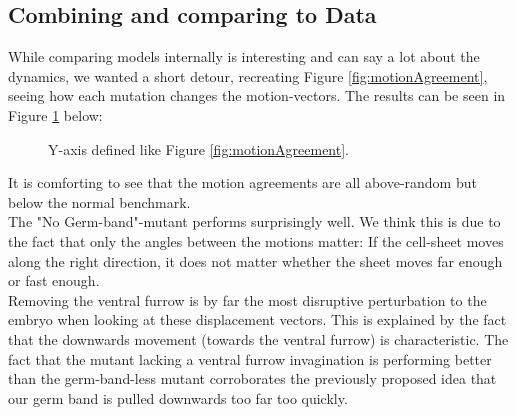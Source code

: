 \subsection{Combining and comparing to Data}
While comparing models internally is interesting and can say a lot about the dynamics, we wanted a short detour, recreating Figure \ref{fig:motionAgreement}, seeing how each mutation changes the motion-vectors. The results can be seen in Figure \ref{fig:compare-motionAgreement-time} below:

\begin{figure}[H]
    \centering
    \caption{Y-axis defined like Figure \ref{fig:motionAgreement}.}
    \label{fig:compare-motionAgreement-time}
\end{figure}
It is comforting to see that the motion agreements are all above-random but below the normal benchmark.\\

The "No Germ-band"-mutant performs surprisingly well. We think this is due to the fact that only the angles between the motions matter: If the cell-sheet moves along the right direction, it does not matter whether the sheet moves far enough or fast enough.\\

Removing the ventral furrow is by far the most disruptive perturbation to the embryo when looking at these displacement vectors. This is explained by the fact that the downwards movement (towards the ventral furrow) is characteristic. The fact that the mutant lacking a ventral furrow invagination is performing better than the germ-band-less mutant corroborates the previously proposed idea that our germ band is pulled downwards too far too quickly.\\

